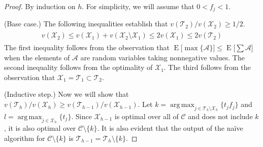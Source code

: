 \documentclass[12pt]{article} %
\DeclareMathOperator*{\argmax}{arg\,max}
\theoremstyle{definition}
\theoremstyle{definition}
\begin{document}
\begin{proof}
By induction on $h$. For simplicity, we will assume that $0 < f_j < 1$.

(Base case.) The following inequalities establish that $v(\mathcal{T}_2) / v(\mathcal{X}_2) \geq 1/2$.
\begin{align}
\begin{split}
v(\mathcal{X}_2) \leq v(\mathcal{X}_1) + v(\mathcal{X}_2 \setminus \mathcal{X}_1) \leq 2 v(\mathcal{X}_1) \leq 2 v(\mathcal{T}_2)
\end{split}
\end{align}
The first inequality follows from the observation that $ \operatorname{E}\bigl[\max\{\mathcal{A}\}\bigr] \leq \operatorname{E}\bigl[  \sum \mathcal{A} \bigr]$ when the elements of $\mathcal{A}$ are random variables taking nonnegative values. The second inequality follows from the optimality of $\mathcal{X}_1$. The third follows from the observation that $\mathcal{X}_1 = \mathcal{T}_1 \subset \mathcal{T}_2$.

(Inductive step.) Now we will show that $v(\mathcal{T}_h) / v(\mathcal{X}_h) \geq v(\mathcal{T}_{h-1}) / v(\mathcal{X}_{h-1})$. Let $k = \argmax_{j\in \mathcal{T}_h \setminus \mathcal{X}_h} \{ t_j f_j\}$ and $l =  \argmax_{j\in \mathcal{X}_h} \{ t_j \}$. %
Since $\mathcal{X}_{h-1}$ is optimal over all of $\mathcal{C}$ and does not include $k$, it is also optimal over $\mathcal{C}\setminus \{k\}$. It is also evident that the output of the na\"ive algorithm for $\mathcal{C} \setminus \{k\}$ is $\mathcal{T}_{h-1}= \mathcal{T}_h \setminus \{k\}$.


\end{proof}
\end{document}
